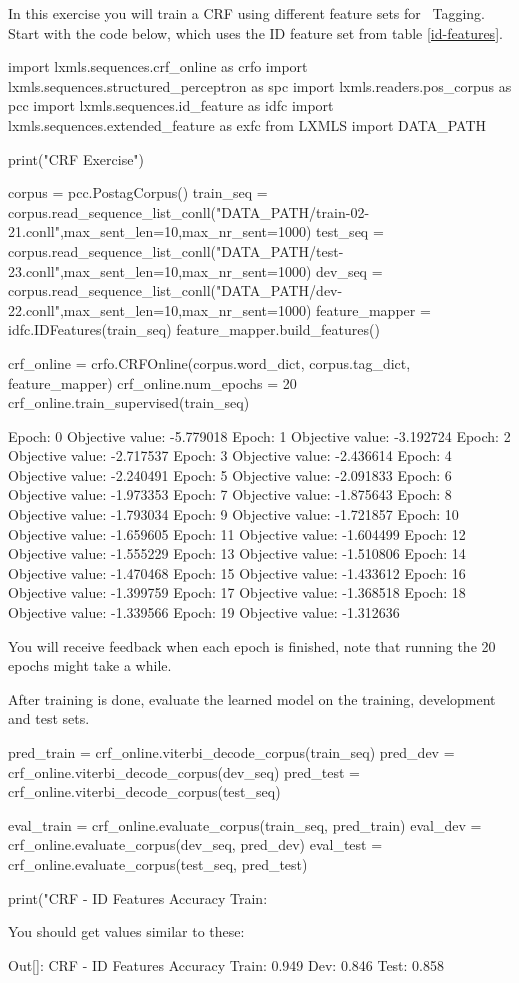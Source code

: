 \begin{exercise}\label{exer:crf1}
In this exercise you will train a CRF
using different feature sets for \pos\ Tagging. Start with the code below, which uses the ID feature set from table \ref{id-features}.
\begin{python}
import lxmls.sequences.crf_online as crfo
import lxmls.sequences.structured_perceptron as spc
import lxmls.readers.pos_corpus as pcc
import lxmls.sequences.id_feature as idfc
import lxmls.sequences.extended_feature as exfc
from LXMLS import DATA_PATH

print("CRF Exercise")

corpus = pcc.PostagCorpus()
train_seq = corpus.read_sequence_list_conll("DATA_PATH/train-02-21.conll",max_sent_len=10,max_nr_sent=1000)
test_seq = corpus.read_sequence_list_conll("DATA_PATH/test-23.conll",max_sent_len=10,max_nr_sent=1000)
dev_seq = corpus.read_sequence_list_conll("DATA_PATH/dev-22.conll",max_sent_len=10,max_nr_sent=1000)
feature_mapper = idfc.IDFeatures(train_seq)
feature_mapper.build_features()

crf_online = crfo.CRFOnline(corpus.word_dict, corpus.tag_dict, feature_mapper)
crf_online.num_epochs = 20
crf_online.train_supervised(train_seq)

Epoch: 0 Objective value: -5.779018
Epoch: 1 Objective value: -3.192724
Epoch: 2 Objective value: -2.717537
Epoch: 3 Objective value: -2.436614
Epoch: 4 Objective value: -2.240491
Epoch: 5 Objective value: -2.091833
Epoch: 6 Objective value: -1.973353
Epoch: 7 Objective value: -1.875643
Epoch: 8 Objective value: -1.793034
Epoch: 9 Objective value: -1.721857
Epoch: 10 Objective value: -1.659605
Epoch: 11 Objective value: -1.604499
Epoch: 12 Objective value: -1.555229
Epoch: 13 Objective value: -1.510806
Epoch: 14 Objective value: -1.470468
Epoch: 15 Objective value: -1.433612
Epoch: 16 Objective value: -1.399759
Epoch: 17 Objective value: -1.368518
Epoch: 18 Objective value: -1.339566
Epoch: 19 Objective value: -1.312636
\end{python}

You will receive feedback when each epoch is finished, note that
running the 20 epochs might take a while.

After training is done, evaluate the learned model on the training, development and test sets.

\begin{python}
pred_train = crf_online.viterbi_decode_corpus(train_seq)
pred_dev = crf_online.viterbi_decode_corpus(dev_seq)
pred_test = crf_online.viterbi_decode_corpus(test_seq)

eval_train = crf_online.evaluate_corpus(train_seq, pred_train)
eval_dev = crf_online.evaluate_corpus(dev_seq, pred_dev)
eval_test = crf_online.evaluate_corpus(test_seq, pred_test)

print("CRF - ID Features Accuracy Train: %
\end{python}

You should get values similar to these:
\begin{python}
Out[]: CRF - 
ID Features Accuracy Train: 0.949 Dev: 0.846 Test: 0.858
\end{python}
\end{exercise}

